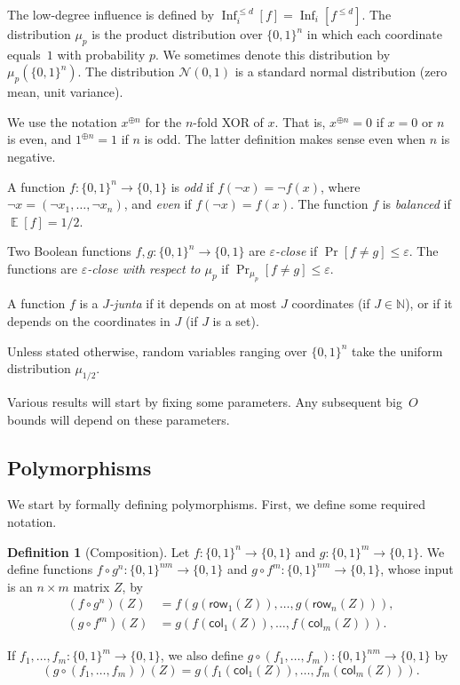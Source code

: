\documentclass{article}
\theoremstyle{definition}
\newtheorem{definition}[theorem]{Definition}
\theoremstyle{remark}
\providecommand{\row}{\mathsf{row}}
\providecommand{\col}{\mathsf{col}}
\DeclareMathOperator*{\E}{\mathbb{E}}
\DeclareMathOperator{\Inf}{Inf}
\providecommand{\normal}{\mathcal{N}}
\providecommand{\stdnormal}{\normal(0,1)}
\newcommand\eps{\varepsilon}
\renewcommand\epsilon{\eps}
\renewcommand\leq{\leqslant}
\begin{document}
The low-degree influence is defined by $\Inf_i^{\leq d}[f] = \Inf_i[f^{\leq d}]$. The distribution $\mu_p$ is the product distribution over $\{0,1\}^n$ in which each coordinate equals~$1$ with probability $p$. We sometimes denote this distribution by $\mu_p(\{0,1\}^n)$. The distribution $\stdnormal$ is a standard normal distribution (zero mean, unit variance).

We use the notation $x^{\oplus n}$ for the $n$-fold XOR of $x$. That is, $x^{\oplus n} = 0$ if $x = 0$ or $n$ is even, and $1^{\oplus n} = 1$ if $n$ is odd. The latter definition makes sense even when $n$ is negative.

A function $f\colon \{0,1\}^n \to \{0,1\}$ is \emph{odd} if $f(\lnot x) = \lnot f(x)$, where $\lnot x = (\lnot x_1,\ldots,\lnot x_n)$, and \emph{even} if $f(\lnot x) = f(x)$. The function $f$ is \emph{balanced} if $\E[f] = 1/2$.

Two Boolean functions $f,g\colon \{0,1\}^n \to \{0,1\}$ are \emph{$\epsilon$-close} if $\Pr[f \neq g] \leq \epsilon$. The functions are \emph{$\epsilon$-close with respect to $\mu_p$} if $\Pr_{\mu_p}[f \neq g] \leq \epsilon$.

A function $f$ is a \emph{$J$-junta} if it depends on at most $J$ coordinates (if $J \in \mathbb{N}$), or if it depends on the coordinates in $J$ (if $J$ is a set).

Unless stated otherwise, random variables ranging over $\{0,1\}^n$ take the uniform distribution $\mu_{1/2}$.

Various results will start by fixing some parameters. Any subsequent big~$O$ bounds will depend on these parameters.

\subsection{Polymorphisms}
\label{sec:prel-polymorphisms}

We start by formally defining polymorphisms. First, we define some required notation.

\begin{definition}[Composition]
Let $f\colon \{0,1\}^n \to \{0,1\}$ and $g\colon \{0,1\}^m \to \{0,1\}$. We define functions $f\circ g^n\colon \{0,1\}^{nm} \to \{0,1\}$ and $g\circ f^m\colon \{0,1\}^{nm} \to \{0,1\}$, whose input is an $n \times m$ matrix $Z$, by
\begin{align*}
(f \circ g^n)(Z) &= f(g(\row_1(Z)),\ldots,g(\row_n(Z))), \\
(g\circ f^m)(Z) &=
g(f(\col_1(Z)),\ldots,f(\col_m(Z))).
\end{align*}

If $f_1,\ldots,f_m\colon \{0,1\}^m \to \{0,1\}$, we also define $g \circ (f_1,\ldots,f_m)\colon \{0,1\}^{nm} \to \{0,1\}$ by
\[
 (g \circ (f_1,\ldots,f_m))(Z) =
 g(f_1(\col_1(Z)), \ldots, f_m(\col_m(Z))).
\]
\end{definition}
\end{document}
